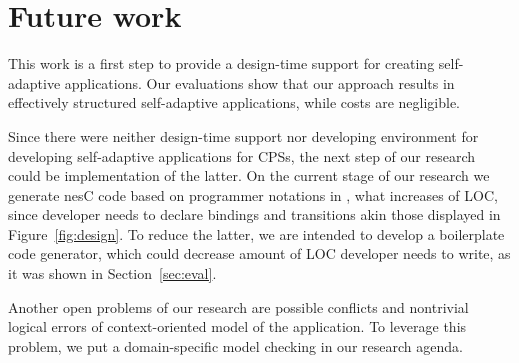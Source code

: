 \section{Future work}

This work is a first step to provide a design-time support for creating
self-adaptive applications. Our evaluations show that our approach results in
effectively structured self-adaptive applications, while costs are negligible.

Since there were neither design-time support nor developing environment for
developing self-adaptive applications for CPSs, the next step of our research
could be implementation of the latter. On the current stage of our research we
generate nesC code based on programmer notations in \conesc, what increases of
LOC, since developer needs to declare bindings and transitions akin those
displayed in Figure~\ref{fig:design}. To reduce the latter, we are intended to
develop a boilerplate code generator, which could decrease amount of LOC
developer needs to write, as it was shown in Section~\ref{sec:eval}.

Another open problems of our research are possible conflicts and nontrivial
logical errors of context-oriented model of the application. To leverage this
problem, we put a domain-specific model checking in our research agenda.

